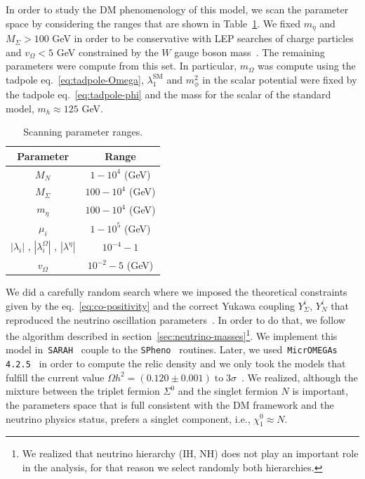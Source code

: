\documentclass[12pt,letterpaper]{article}
\begin{document}
In order to study the DM phenomenology of this model, we scan the parameter space by considering the ranges that are shown in Table~\ref{tab:scan-parameter}. We fixed $m_{\eta}$ and $M_{\Sigma} > 100$ GeV in order to be conservative with LEP searches of charge particles~\cite{ALEPH:2005ab} and $v_{\Omega}<5$ GeV constrained by the $W$ gauge boson mass~\cite{Agashe:2014kda}. 
The remaining parameters were compute from this set. 
In particular, $m_{\Omega}$ was compute using the tadpole eq.~\ref{eq:tadpole-Omega}, $\lambda_1^{\text{SM}}$ and $m_{\phi}^2$ in the scalar potential were fixed by the tadpole eq.~\ref{eq:tadpole-phi} and the mass for the scalar of the standard model, $m_{h}\approx 125$ GeV.
%
\begin{table}
\centering
\begin{tabular}{|c|c|}
\hline
Parameter & Range\\
\hline
$M_N$ &  $1-10^4$ (GeV) \\
$M_{\Sigma}$ &  $100-10^4$ (GeV) \\
$m_{\eta}$ &  $100-10^4$ (GeV) \\
$\mu_i$ & $1-10^{5}$ (GeV) \\
$|\lambda_i|$ , $|\lambda_i^{\Omega}|$ , $|\lambda^{\eta}|$ & $10^{-4} - 1$ \\
$v_{\Omega}$ & $10^{-2}- 5$  (GeV)\\
\hline
\end{tabular}
\caption{Scanning parameter ranges.}
\label{tab:scan-parameter}
\end{table}
%
We did  a carefully random search where we imposed the theoretical constraints given by the eq.~\ref{eq:co-positivity} and the correct Yukawa coupling $Y_{\Sigma}^i$, $Y_N^i$ that reproduced the neutrino oscillation parameters~\cite{Forero:2014bxa, deSalas:2017kay}. In order to do that, we follow the algorithm described in section~\ref{sec:neutrino-masses}\footnote{We realized that neutrino hierarchy (IH, NH) does not play an important role in the analysis, for that reason we select randomly both hierarchies.}.
%
We implement this model in~\texttt{SARAH}~\cite{Staub:2008uz,Staub:2009bi,Staub:2010jh,Staub:2012pb,Staub:2013tta} couple to the \texttt{SPheno}~\cite{Porod:2003um,Porod:2011nf} routines. 
Later, we used~\texttt{MicrOMEGAs 4.2.5}~\cite{Belanger:2006is} in order to compute the relic density and we only took the models that fulfill the current value $\Omega h^2 = (0.120 \pm 0.001)\; \text{to}\; 3\sigma$~\cite{Aghanim:2018eyx}.
We realized, although the mixture between the triplet fermion $\Sigma^0$ and the singlet fermion $N$ is important, the parameters space that is full consistent with the DM framework and the neutrino physics status, prefers a singlet component, i.e., $\chi_1^0\approx N$. 
\end{document}
